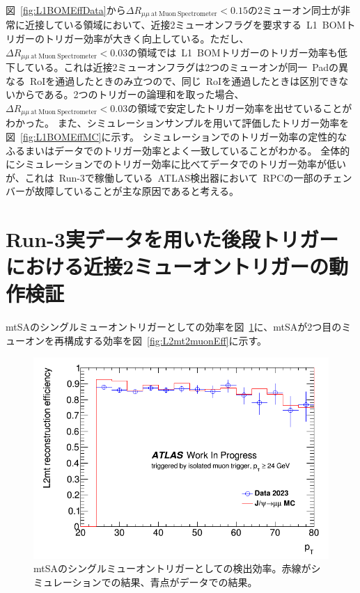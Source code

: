 図~\ref{fig:L1BOMEffData}から$\Delta R_{\mu\mu~\mathrm{at~Muon~Spectrometer}}<0.15$の2ミューオン同士が非常に近接している領域において、近接2ミューオンフラグを要求する~L1~BOMトリガーのトリガー効率が大きく向上している。ただし、$\Delta R_{\mu\mu~\mathrm{at~Muon~Spectrometer}}<0.03$の領域では~L1~BOMトリガーのトリガー効率も低下している。これは近接2ミューオンフラグは2つのミューオンが同一~Padの異なる~RoIを通過したときのみ立つので、同じ~RoIを通過したときは区別できないからである。2つのトリガーの論理和を取った場合、$\Delta R_{\mu\mu~\mathrm{at~Muon~Spectrometer}}<0.03$の領域で安定したトリガー効率を出せていることがわかった。
また、シミュレーションサンプルを用いて評価したトリガー効率を図~\ref{fig:L1BOMEffMC}に示す。
シミュレーションでのトリガー効率の定性的なふるまいはデータでのトリガー効率とよく一致していることがわかる。
全体的にシミュレーションでのトリガー効率に比べてデータでのトリガー効率が低いが、これは~Run-3で稼働している~ATLAS検出器において~RPCの一部のチェンバーが故障していることが主な原因であると考える。

\section{Run-3実データを用いた後段トリガーにおける近接2ミューオントリガーの動作検証}\label{chapter4-4}

mtSAのシングルミューオントリガーとしての効率を図~\ref{fig:L2mtSingleEff}に、mtSAが2つ目のミューオンを再構成する効率を図~\ref{fig:L2mt2muonEff}に示す。

\begin{figure}[H]
    \centering
    \includegraphics[clip, width=12cm]{fig/4/L2mt_singlemuon_eff.png}
    \caption{mtSAのシングルミューオントリガーとしての検出効率。赤線がシミュレーションでの結果、青点がデータでの結果。}
    \label{fig:L2mtSingleEff}
\end{figure}

